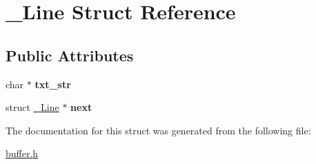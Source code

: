 \hypertarget{struct__Line}{}\section{\+\_\+\+Line Struct Reference}
\label{struct__Line}
\subsection*{Public Attributes}
\begin{DoxyCompactItemize}
\item 
\hypertarget{struct__Line_a2fb78a10951a1e4dd22f6ec19d031e3f}{}\label{struct__Line_a2fb78a10951a1e4dd22f6ec19d031e3f} 
char $\ast$ {\bfseries txt\+\_\+str}
\item 
\hypertarget{struct__Line_ae45f997f141a59a1a25df8a924f27f94}{}\label{struct__Line_ae45f997f141a59a1a25df8a924f27f94} 
struct \hyperlink{struct__Line}{\+\_\+\+Line} $\ast$ {\bfseries next}
\end{DoxyCompactItemize}


The documentation for this struct was generated from the following file\+:\begin{DoxyCompactItemize}
\item 
\hyperlink{buffer_8h}{buffer.\+h}\end{DoxyCompactItemize}
